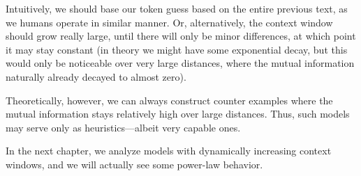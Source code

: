 \documentclass[../../main.tex]{subfiles}
\begin{document}
    Intuitively, we should base our token guess based on the entire previous text, as we humans operate in similar manner. Or, alternatively, the context window should grow really large, until there will only be minor differences, at which point it may stay constant (in theory we might have some exponential decay, but this would only be noticeable over very large distances, where the mutual information naturally already decayed to almost zero).

    Theoretically, however, we can always construct counter examples where the mutual information stays relatively high over large distances. Thus, such models may serve only as heuristics—albeit very capable ones.

    In the next chapter, we analyze models with dynamically increasing context windows, and we will actually see some power-law behavior.
\end{document}
